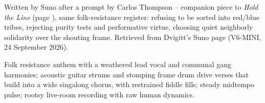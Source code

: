 
\label{sec:pass-the-bread}
\begin{notes}
Written by Suno after a prompt by Carlos Thompson -- companion piece to \emph{Hold the Line} (page \pageref{sec:hold-the-line}), same folk-resistance register: refusing to be sorted into red/blue tribes, rejecting purity tests and performative virtue, choosing quiet neighborly solidarity over the shouting frame. Retrieved from Dvigitt's Suno page (V6-MINI, 24 September 2026).
\end{notes}
\begin{style}
Folk resistance anthem with a weathered lead vocal and communal gang harmonies; acoustic guitar strums and stomping frame drum drive verses that build into a wide singalong chorus, with restrained fiddle fills; steady midtempo pulse; rootsy live-room recording with raw human dynamics.
\end{style}
